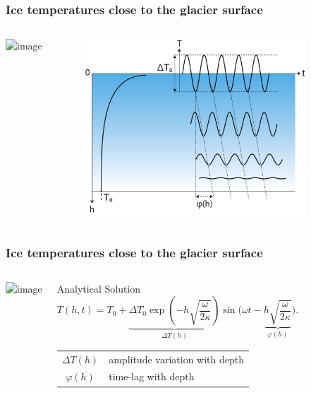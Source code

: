 \documentclass[hide notes,intlimits,unknownkeysallowed]{beamer}
\begin{document}
\begin{frame}
  \frametitle{Ice temperatures close to the glacier surface}
  \begin{columns}
    \column[T]{1.75cm} 
    \vspace{1cm}
    {\includegraphics<1>[width=1.5cm]{glaciersv_c}}%
    \vspace{2.5cm}
    \column[T]{10.25cm}
    \begin{figure}
    \includegraphics[width=8.25cm]{temp-attenuation}
   \end{figure}
 \end{columns}  
\end{frame}


\begin{frame}
  \frametitle{Ice temperatures close to the glacier surface}
  \begin{columns}
    \column[T]{1.75cm} 
    \vspace{1cm}
    {\includegraphics<1>[width=1.5cm]{glaciersv_c}}%
    \vspace{2.5cm}
    \column[T]{10.25cm}
    \begin{block}{Analytical Solution}
      \begin{equation*}
        \label{eq:heat-flow-1d-solution}
        T(h,t) = T_0 + \underbrace{\Delta T_0 \exp\left(-h \sqrt{\frac{\omega}{2\kappa}}\right)}_{\Delta T(h)}
        \sin\Big(\omega t - \underbrace{h \sqrt{\frac{\omega}{2\kappa}}}_{\varphi(h)}\Big).
      \end{equation*}
      \begin{tabular}{cl}
        $\Delta T(h)$ & amplitude variation with depth \\
        $\varphi(h)$ & time-lag with depth
      \end{tabular}
    \end{block}
  \end{columns}  
\end{frame}
\end{document}
